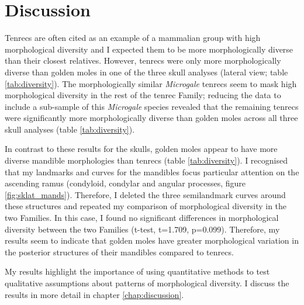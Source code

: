 
\section{Discussion}



	Tenrecs are often cited as an example of a mammalian group with high morphological diversity \citep{Olson2013, Soarimalala2011, Eisenberg1969} and I expected them to be more morphologically diverse than their closest relatives. However, tenrecs were only more morphologically diverse than golden moles in one of the three skull analyses (lateral view; table \ref{tab:diversity}). The morphologically similar \textit{Microgale} tenrecs seem to mask high morphological diversity in the rest of the tenrec Family; reducing the data to include a sub-sample of this \textit{Microgale} species revealed that the remaining tenrecs were significantly more morphologically diverse than golden moles across all three skull analyses (table \ref{tab:diversity}). 
	
	In contrast to these results for the skulls, golden moles appear to have more diverse mandible morphologies than tenrecs (table \ref{tab:diversity}). I recognised that my landmarks and curves for the mandibles focus particular attention on the ascending ramus (condyloid, condylar and angular processes, figure \ref{fig:sklat_mands}). Therefore, I  deleted the three semilandmark curves around these structures and repeated my comparison of morphological diversity in the two Families. In this case, I found no significant differences in morphological diversity between the two Families (t-test, t=1.709, p=0.099). Therefore, my results seem to indicate that golden moles have greater morphological variation in the posterior structures of their mandibles compared to tenrecs.
	
	My results highlight the importance of using quantitative methods to test qualitative assumptions about patterns of morphological diversity. I discuss the results in more detail in chapter \ref{chap:discussion}.




